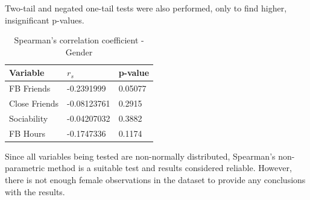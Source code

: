 
Two-tail and negated one-tail tests were also performed, only to find higher, insignificant p-values.

\begin{table}[H]
\centering
\caption{Spearman's correlation coefficient - Gender}
\begin{tabular}{l|l|l}
Variable      & $r_s$      & p-value \\ \hline
FB Friends    & -0.2391999  & 0.05077 \\ \hline
Close Friends & -0.08123761 & 0.2915  \\ \hline
Sociability   & -0.04207032 & 0.3882  \\ \hline
FB Hours      & -0.1747336  & 0.1174  \\ \hline
\end{tabular}
\end{table}

Since all variables being tested are non-normally distributed, Spearman's non-parametric method is a suitable test and results considered reliable. However, there is not enough female observations in the dataset to provide any conclusions with the results.



